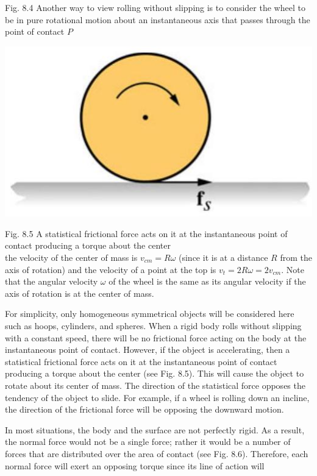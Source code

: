\documentclass[10pt]{article}
\begin{document}
Fig. 8.4 Another way to view rolling without slipping is to consider the wheel to be in pure rotational motion about an instantaneous axis that passes through the point of contact $P$

\begin{center}
\includegraphics[max width=\textwidth]{2024_09_13_db1f357d2aad0a03eb2eg-132(4)}
\end{center}

Fig. 8.5 A statistical frictional force acts on it at the instantaneous point of contact producing a torque about the center\\
the velocity of the center of mass is $v_{c m}=R \omega$ (since it is at a distance $R$ from the axis of rotation) and the velocity of a point at the top is $v_{t}=2 R \omega=2 v_{c m}$. Note that the angular velocity $\omega$ of the wheel is the same as its angular velocity if the axis of rotation is at the center of mass.

For simplicity, only homogeneous symmetrical objects will be considered here such as hoops, cylinders, and spheres. When a rigid body rolls without slipping with a constant speed, there will be no frictional force acting on the body at the instantaneous point of contact. However, if the object is accelerating, then a statistical frictional force acts on it at the instantaneous point of contact producing a torque about the center (see Fig. 8.5). This will cause the object to rotate about its center of mass. The direction of the statistical force opposes the tendency of the object to slide. For example, if a wheel is rolling down an incline, the direction of the frictional force will be opposing the downward motion.

In most situations, the body and the surface are not perfectly rigid. As a result, the normal force would not be a single force; rather it would be a number of forces that are distributed over the area of contact (see Fig. 8.6). Therefore, each normal force will exert an opposing torque since its line of action will
\end{document}
